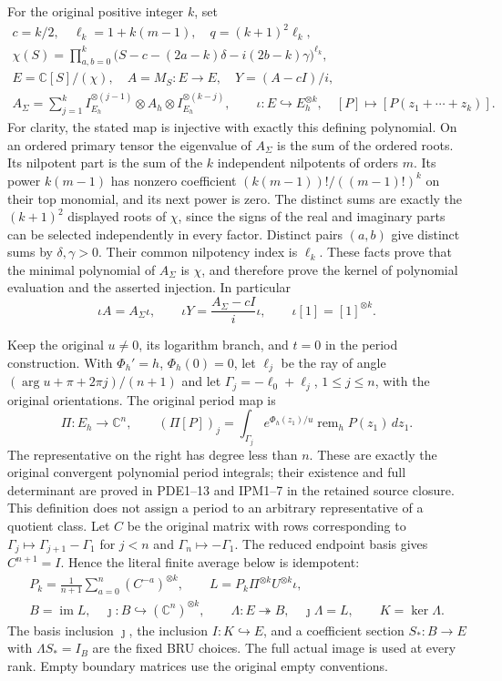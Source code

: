 \documentclass[11pt,a4paper]{article}
\begin{document}
For the original positive integer $k$, set
\[
\begin{gathered}
 c=k/2,\quad \ell_k=1+k(m-1),\quad q=(k+1)^2\ell_k,\\
 \chi(S)=\prod_{a,b=0}^k
   \bigl(S-c-(2a-k)\delta-i(2b-k)\gamma\bigr)^{\ell_k},\\
 E=\mathbb C[S]/(\chi),\quad A=M_S:E\to E,\quad
 Y=(A-cI)/i,\\
 A_\Sigma=\sum_{j=1}^k
      I_{E_h}^{\otimes(j-1)}\otimes A_h\otimes I_{E_h}^{\otimes(k-j)},
 \qquad
 \iota:E\hookrightarrow E_h^{\otimes k},\quad
 [P]\longmapsto[P(z_1+\cdots+z_k)].
\end{gathered}\tag{OPG2}
\]
For clarity, the stated map is injective with exactly this defining
polynomial. On an ordered primary tensor the eigenvalue of
$A_\Sigma$ is the sum of the ordered roots. Its nilpotent part is
the sum of the $k$ independent nilpotents of orders $m$.
Its power $k(m-1)$ has nonzero coefficient
$(k(m-1))!/((m-1)!)^k$ on their top monomial, and its next power
is zero. The distinct sums are exactly the $(k+1)^2$ displayed
roots of $\chi$, since the signs of the real and imaginary parts
can be selected independently in every factor. Distinct pairs
$(a,b)$ give distinct sums by $\delta,\gamma>0$. Their common
nilpotency index is $\ell_k$. These facts prove that the minimal
polynomial of $A_\Sigma$ is $\chi$, and therefore prove the
kernel of polynomial evaluation and the asserted injection.
In particular
\[
 \iota A=A_\Sigma\iota,\qquad
 \iota Y=\frac{A_\Sigma-cI}{i}\iota,\qquad
 \iota[1]=[1]^{\otimes k}.
 \tag{OPG3}
\]

Keep the original $u\ne0$, its logarithm branch, and $t=0$ in
the period construction. With $\Phi_h'=h$, $\Phi_h(0)=0$,
let $\ell_j$ be the ray of angle
$(\arg u+\pi+2\pi j)/(n+1)$ and let
$\Gamma_j=-\ell_0+\ell_j$, $1\leq j\leq n$, with the original
orientations. The original period map is
\[
 \Pi:E_h\to\mathbb C^n,\qquad
 (\Pi[P])_j=\int_{\Gamma_j}e^{\Phi_h(z_1)/u}
                    \operatorname{rem}_h P(z_1)\,dz_1.
 \tag{OPG4}
\]
The representative on the right has degree less than $n$. These
are exactly the original convergent polynomial period integrals;
their existence and full determinant are proved in PDE1--13 and
IPM1--7 in the retained source closure. This definition does not
assign a period to an arbitrary representative of a quotient class.
Let $C$ be the original matrix with rows corresponding to
$\Gamma_j\mapsto\Gamma_{j+1}-\Gamma_1$ for $j<n$ and
$\Gamma_n\mapsto-\Gamma_1$. The reduced endpoint basis gives
$C^{n+1}=I$. Hence the literal finite average below is idempotent:
\[
\begin{gathered}
 P_k=\frac1{n+1}\sum_{a=0}^{n}(C^{-a})^{\otimes k},\qquad
 L=P_k\Pi^{\otimes k}U^{\otimes k}\iota,\\
 B=\operatorname{im}L,\quad\jmath:B\hookrightarrow(\mathbb C^n)^{\otimes k},
 \qquad\Lambda:E\twoheadrightarrow B,\quad\jmath\Lambda=L,
 \qquad K=\ker\Lambda.
\end{gathered}\tag{OPG5}
\]
The basis inclusion $\jmath$, the inclusion $I:K\hookrightarrow E$,
and a coefficient section $S_*:B\to E$ with $\Lambda S_*=I_B$
are the fixed BRU choices. The full actual image is used at every
rank. Empty boundary matrices use the original empty conventions.
\end{document}
